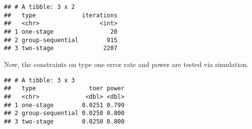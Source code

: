 \documentclass[]{book}
\newenvironment{Shaded}{\begin{snugshade}}{\end{snugshade}}
\newcommand{\DataTypeTok}[1]{\textcolor[rgb]{0.13,0.29,0.53}{#1}}
\newcommand{\DecValTok}[1]{\textcolor[rgb]{0.00,0.00,0.81}{#1}}
\newcommand{\FloatTok}[1]{\textcolor[rgb]{0.00,0.00,0.81}{#1}}
\newcommand{\KeywordTok}[1]{\textcolor[rgb]{0.13,0.29,0.53}{\textbf{#1}}}
\newcommand{\NormalTok}[1]{#1}
\newcommand{\OperatorTok}[1]{\textcolor[rgb]{0.81,0.36,0.00}{\textbf{#1}}}
\newcommand{\StringTok}[1]{\textcolor[rgb]{0.31,0.60,0.02}{#1}}
\begin{document}
\begin{verbatim}
## # A tibble: 3 x 2
##   type             iterations
##   <chr>                 <int>
## 1 one-stage                20
## 2 group-sequential        915
## 3 two-stage              2207
\end{verbatim}

Now, the constraints on type one error rate and power are tested via simulation.

\begin{Shaded}
\end{Shaded}

\begin{verbatim}
## # A tibble: 3 x 3
##   type               toer power
##   <chr>             <dbl> <dbl>
## 1 one-stage        0.0251 0.799
## 2 group-sequential 0.0250 0.800
## 3 two-stage        0.0250 0.800
\end{verbatim}
\end{document}
